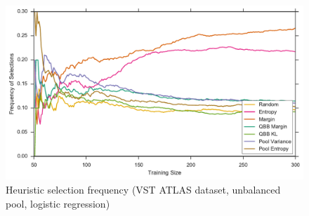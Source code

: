 \begin{figure}[p]
	\centering
	\includegraphics[width=\textwidth]{figures/5_thompson/vstatlas_ul_frequencies}
	\caption[Heuristic selection frequency (VST ATLAS, unbalanced, logistic)]{
		Heuristic selection frequency (VST ATLAS dataset, unbalanced pool, logistic regression)}
	\label{fig:vstatlas_ul_frequencies}
\end{figure}

